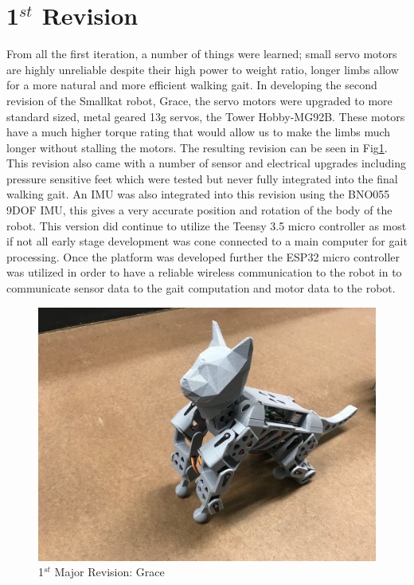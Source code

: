 \documentclass[12pt]{report}
\begin{document}
\section{1$^{st}$ Revision}
From all the first iteration, a number of things were learned; small servo motors are highly unreliable despite their high power to weight ratio, longer limbs allow for a more natural and  more efficient walking gait. In developing the second revision of the Smallkat robot, Grace, the servo motors were upgraded to more standard sized, metal geared 13g servos, the Tower Hobby-MG92B. These motors have a much higher torque rating that would allow us to make the limbs much longer without stalling the motors. The resulting revision can be seen in Fig\ref{fig:Grace}. This revision also came with a number of sensor and electrical upgrades including pressure sensitive feet which were tested but never fully integrated into the final walking gait. An IMU was also integrated into this revision using the BNO055 9DOF IMU, this gives a very accurate position and rotation of the body of the robot. This version did continue to utilize the Teensy 3.5 micro controller as most if not all early stage development was cone connected to a main computer for gait processing. Once the platform was developed further the ESP32 micro controller was utilized in order to have a reliable wireless communication to the robot in to communicate sensor data to the gait computation and motor data to the robot. 
\begin{figure}[H]
    \centering
    \includegraphics[width=0.5\textheight]{Images/1_sYQmYZO2XCQVxt3-icmhLw.jpeg}
    \caption{1$^{st}$ Major Revision: Grace}
    \label{fig:Grace}
\end{figure}
\end{document}
